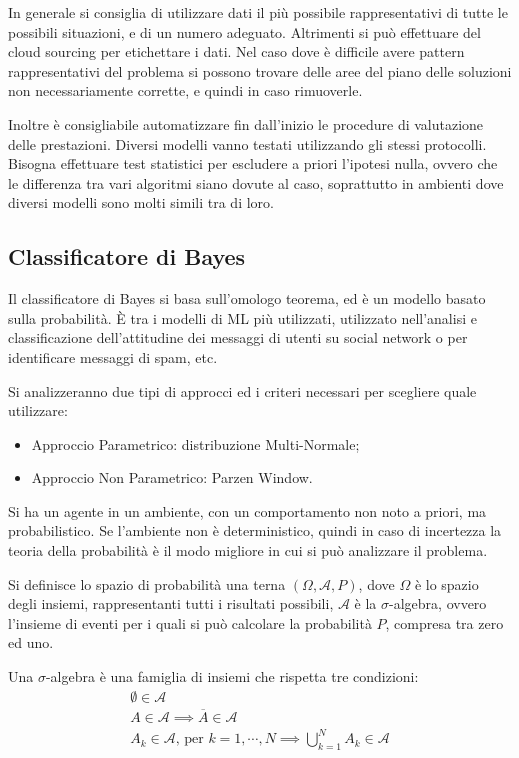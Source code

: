 \documentclass{article}
\numberwithin{equation}{subsection}
\begin{document}
In generale si consiglia di utilizzare dati il più possibile rappresentativi di tutte le possibili situazioni, e di un numero adeguato. Altrimenti si può effettuare del cloud sourcing per etichettare i dati. 
Nel caso dove è difficile avere pattern rappresentativi del problema si possono trovare delle aree del piano delle soluzioni non necessariamente corrette, e quindi in caso rimuoverle. 

Inoltre è consigliabile automatizzare fin dall'inizio le procedure di valutazione delle prestazioni. Diversi modelli vanno testati utilizzando gli stessi protocolli. Bisogna effettuare test statistici per escludere a priori l'ipotesi nulla, ovvero che le differenza tra vari algoritmi siano dovute al caso, soprattutto in ambienti dove diversi modelli sono molti simili tra di loro. 

\subsection{Classificatore di Bayes}

Il classificatore di Bayes si basa sull'omologo teorema, ed è un modello basato sulla probabilità. \`{E} tra i modelli di ML più utilizzati, utilizzato nell'analisi e 
classificazione dell'attitudine dei messaggi di utenti su social network o per identificare messaggi di spam, etc. 

Si analizzeranno due tipi di approcci ed i criteri necessari per scegliere quale utilizzare:
\begin{itemize}
    \item Approccio Parametrico: distribuzione Multi-Normale;
    \item Approccio Non Parametrico: Parzen Window. 
\end{itemize}

Si ha un agente in un ambiente, con un comportamento non noto a priori, ma probabilistico. Se l'ambiente non è deterministico, quindi in caso di incertezza la teoria della probabilità è il modo migliore in cui si può analizzare il problema. 

Si definisce lo spazio di probabilità una terna $(\Omega, \mathscr{A},P)$, dove $\Omega$ è lo spazio degli insiemi, rappresentanti tutti i risultati possibili, $\mathscr{A}$ è la $\sigma$-algebra, ovvero l'insieme di eventi per i quali si può calcolare la probabilità $P$, compresa tra zero ed uno. 

Una $\sigma$-algebra è una famiglia di insiemi che rispetta tre condizioni:
\begin{gather*}
    \emptyset\in\mathscr{A}\\
    A\in\mathscr{A}\implies\overline{A}\in\mathscr{A}\\
    A_k\in\mathscr{A},\,\text{per }k=1,\cdots,N\implies\bigcup_{k=1}^NA_k\in\mathscr{A}
\end{gather*}
\end{document}
